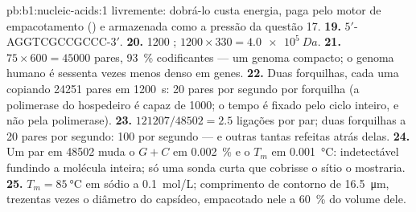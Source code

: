 \begin{solution}{pb:b1:nucleic-acids:1}
livremente: dobrá-lo custa energia, paga pelo motor de empacotamento
() e armazenada como a pressão da questão 17.
\textbf{19.} $5'$-AGGTCGCCGCCC-$3'$.
\textbf{20.} \num{1200} ; $1200\times 330 = \qty{4.0e5}{Da}$.
\textbf{21.} $75\times 600 = \num{45000}$ pares, \qty{93}{\%}
codificantes --- um genoma compacto; o genoma humano é sessenta vezes
menos denso em genes.
\textbf{22.} Duas forquilhas, cada uma copiando \num{24251} pares em
\qty{1200}{s}: \qty{20}{} pares por segundo por forquilha (a polimerase
do hospedeiro é capaz de \qty{1000}{}; o tempo é fixado pelo ciclo
inteiro, e não pela polimerase).
\textbf{23.} $\num{121207}/\num{48502} = 2.5$ ligações por par; duas forquilhas a 20 pares por segundo: 100  por segundo --- e outras tantas refeitas atrás delas.
\textbf{24.} Um par em \num{48502} muda o $G + C$ em \qty{0.002}{\%} e o
$T_m$ em \qty{0.001}{\celsius}: indetectável fundindo a molécula
inteira; só uma sonda curta que cobrisse o sítio o mostraria.
\textbf{25.} $T_m = \qty{85}{\celsius}$ em sódio a \qty{0.1}{mol/L};
comprimento de contorno de \qty{16.5}{\micro m}, trezentas vezes o
diâmetro do capsídeo, empacotado nele a \qty{60}{\%} do volume dele.
\end{solution}
